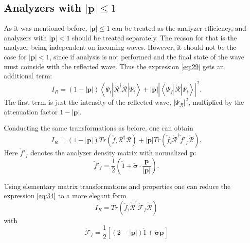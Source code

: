 \documentclass[12pt,a4paper]{article}
\begin{document}
\subsection{Analyzers with $|\boldsymbol{p}| \leq 1$} \label{ssec:nianalyzers}

As it was mentioned before, $|\boldsymbol{p}| \leq 1$ can be treated as the analyzer efficiency, and analyzers with $|\boldsymbol{p}| < 1$ should be treated separately. The reason for that is the analyzer being independent on incoming waves. However, it should not be the case for $|\boldsymbol{p}| < 1$, since if analysis is not performed and the final state of the wave must coinside with the reflected wave. Thus the expression \ref{eq:29} gets an additional term:
\begin{equation}
I_R
=
(1 - |\boldsymbol{p}|)
\left\langle \Psi_i | \check{\mathcal{R}}^{\dagger} \check{\mathcal{R}} | \Psi_i \right\rangle
+
|\boldsymbol{p}|
\left| \left\langle \Psi_f | \check{\mathcal{R}} | \Psi_i \right\rangle \right|^2.
\end{equation}
The first term is just the intensity of the reflected wave, $|\Psi_{\mathcal{R}}|^2$,
multiplied by the attenuation factor $1 - |\boldsymbol{p}|$.

Conducting the same transformations as before, one can obtain
\begin{equation} \label{eq:34}
I_R = (1 - |\boldsymbol{p}|) Tr(\check{f}_i \mathcal{R}^{\dagger} \mathcal{R})
+
|\boldsymbol{p}| Tr(\check{f}_i \check{\mathcal{R}}^{\dagger} \check{f}'_f \check{\mathcal{R}}).
\end{equation}
Here $\check{f}'_f$ denotes the analyzer density matrix with normalized $\boldsymbol{p}$:
\begin{equation}
\check{f}'_f = \frac{1}{2} \left( \check{1} + \boldsymbol{\check{\sigma}} \cdot \frac{\boldsymbol{p}}{|\boldsymbol{p}|} \right).
\end{equation}

Using elementary matrix transformations and properties one can reduce the expression \ref{eq:34} to a more elegant form
\begin{equation} \label{eq:36}
I_R = Tr(\check{f}_i \check{\mathcal{R}}^{\dagger} \check{\mathcal{F}}_f \check{\mathcal{R}})
\end{equation}
with
\begin{equation}
\check{\mathcal{F}}_f = \frac{1}{2}
\left[
(2 - |\boldsymbol{p}|) \check{1} + \boldsymbol{\check{\sigma}} \boldsymbol{p}
\right]
\end{equation}
\end{document}
